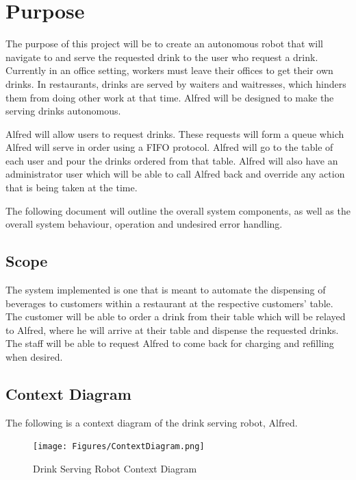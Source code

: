\documentclass [10pt]{article}
\begin{document}

\section {Purpose}

The purpose of this project will be to create an autonomous robot that will navigate to and serve
the requested drink to the user who request a drink. Currently in an office setting, workers must
leave their offices to get their own drinks. In restaurants, drinks are served by waiters and
waitresses, which hinders them from doing other work at that time. Alfred will be designed to make the serving drinks autonomous.\newline

Alfred will allow users to request drinks. These requests will form a queue which Alfred will serve in order using a FIFO protocol. Alfred will go to the table of each user and pour the drinks ordered from that table. Alfred will also have an administrator user which will be able to call Alfred back and override any action that is being taken at the time.\newline

The following document will outline the overall system components, as well as the overall system behaviour, operation and undesired error handling.


\subsection{Scope}

The system implemented is one that is meant to automate the dispensing of beverages to customers within a restaurant at the respective customers' table. The customer will be able to order a drink from their table which will be relayed to Alfred, where he will arrive at their table and dispense the requested drinks. The staff will be able to request Alfred to come back for charging and refilling when desired.



\subsection{Context Diagram}
The following is a context diagram of the drink serving robot, Alfred.
\begin{figure} [h!]
	\centering
	\texttt{[image: Figures/ContextDiagram.png]}
	\caption{Drink Serving Robot Context Diagram}
\end{figure}
\end{document}
